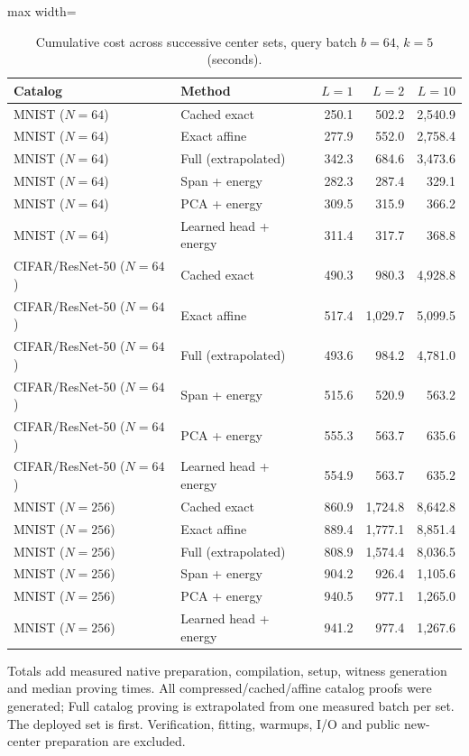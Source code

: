 \begin{table}[tp]
\caption{Cumulative cost across successive center sets, query batch $b=64$, $k=5$ (seconds).}\label{tab:reuse-cost}
\centering\small
\begin{adjustbox}{max width=\textwidth}
\begin{tabular}{@{}llrrr@{}}
\toprule
Catalog & Method & $L=1$ & $L=2$ & $L=10$ \\
\midrule
MNIST ($N=64$) & Cached exact & 250.1 & 502.2 & 2,540.9 \\
MNIST ($N=64$) & Exact affine & 277.9 & 552.0 & 2,758.4 \\
MNIST ($N=64$) & Full (extrapolated) & 342.3 & 684.6 & 3,473.6 \\
MNIST ($N=64$) & Span + energy & 282.3 & 287.4 & 329.1 \\
MNIST ($N=64$) & PCA + energy & 309.5 & 315.9 & 366.2 \\
MNIST ($N=64$) & Learned head + energy & 311.4 & 317.7 & 368.8 \\
CIFAR/ResNet-50 ($N=64$) & Cached exact & 490.3 & 980.3 & 4,928.8 \\
CIFAR/ResNet-50 ($N=64$) & Exact affine & 517.4 & 1,029.7 & 5,099.5 \\
CIFAR/ResNet-50 ($N=64$) & Full (extrapolated) & 493.6 & 984.2 & 4,781.0 \\
CIFAR/ResNet-50 ($N=64$) & Span + energy & 515.6 & 520.9 & 563.2 \\
CIFAR/ResNet-50 ($N=64$) & PCA + energy & 555.3 & 563.7 & 635.6 \\
CIFAR/ResNet-50 ($N=64$) & Learned head + energy & 554.9 & 563.7 & 635.2 \\
MNIST ($N=256$) & Cached exact & 860.9 & 1,724.8 & 8,642.8 \\
MNIST ($N=256$) & Exact affine & 889.4 & 1,777.1 & 8,851.4 \\
MNIST ($N=256$) & Full (extrapolated) & 808.9 & 1,574.4 & 8,036.5 \\
MNIST ($N=256$) & Span + energy & 904.2 & 926.4 & 1,105.6 \\
MNIST ($N=256$) & PCA + energy & 940.5 & 977.1 & 1,265.0 \\
MNIST ($N=256$) & Learned head + energy & 941.2 & 977.4 & 1,267.6 \\
\bottomrule
\end{tabular}
\end{adjustbox}
\par\smallskip\begin{minipage}{0.98\textwidth}\footnotesize Totals add measured native preparation, compilation, setup, witness generation and median proving times. All compressed/cached/affine catalog proofs were generated; Full catalog proving is extrapolated from one measured batch per set. The deployed set is first. Verification, fitting, warmups, I/O and public new-center preparation are excluded.\end{minipage}
\end{table}
